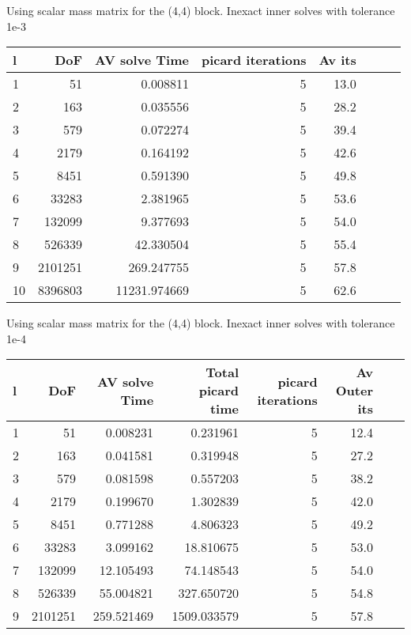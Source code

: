\documentclass{article}
\begin{document}
Using scalar mass matrix for the (4,4) block. Inexact inner solves with
tolerance 1e-3



\begin{tabular}{lrrrrrll}
\hline
l &     DoF &  AV solve Time & picard iterations & Av its\\
\hline
 1 &      51 &       0.008811 &                     5 &         13.0  \\
 2 &     163 &       0.035556 &                     5 &         28.2  \\
 3 &     579 &       0.072274 &                     5 &         39.4  \\
 4 &    2179 &       0.164192 &                     5 &         42.6  \\
 5 &    8451 &       0.591390 &                     5 &         49.8  \\
 6 &   33283 &       2.381965 &                     5 &         53.6  \\
 7 &  132099 &       9.377693 &                     5 &         54.0  \\
 8 &  526339 &      42.330504 &                     5 &         55.4  \\
9 &  2101251 &     269.247755 &                     5 &         57.8 \\  
10 &  8396803 &   11231.974669 &                 5 &         62.6 \\
\hline
\end{tabular}



Using scalar mass matrix for the (4,4) block. Inexact inner solves with
tolerance 1e-4

\begin{tabular}{lrrrrrll}
\toprule
l &     DoF &  AV solve Time &  Total picard time &  picard iterations & Av Outer its\\
\midrule
 1 &      51 &       0.008231 &           0.231961 &                  5 &         12.4  \\
 2 &     163 &       0.041581 &           0.319948 &                  5 &         27.2  \\
 3 &     579 &       0.081598 &           0.557203 &                  5 &         38.2  \\
 4 &    2179 &       0.199670 &           1.302839 &                  5 &         42.0  \\
 5 &    8451 &       0.771288 &           4.806323 &                  5 &         49.2  \\
 6 &   33283 &       3.099162 &          18.810675 &                  5 &         53.0  \\
 7 &  132099 &      12.105493 &          74.148543 &                  5 &         54.0  \\
 8 &  526339 &      55.004821 &         327.650720 &                  5 &         54.8  \\
 9 &  2101251 &     259.521469 &        1509.033579 &                  5 &         57.8 & 
\bottomrule
\end{tabular}
\end{document}
